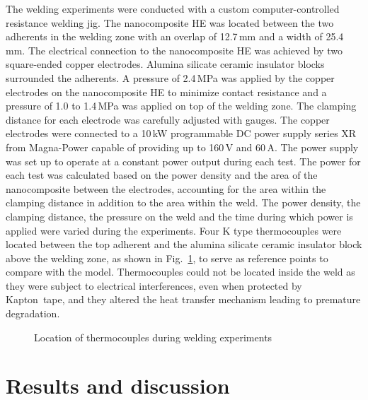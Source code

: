 The welding experiments were conducted with a custom computer-controlled resistance welding jig. 
The nanocomposite HE was located between the two adherents in the welding zone with an overlap of \mbox{12.7\,mm} and a width of \mbox{25.4\,mm}. 
The electrical connection to the nanocomposite HE was achieved by two square-ended copper electrodes. 
Alumina silicate ceramic insulator blocks surrounded the adherents. 
A pressure of \mbox{2.4\,MPa} was applied by the copper electrodes on the nanocomposite HE to minimize contact resistance and a pressure of 1.0 to \mbox{1.4\,MPa} was applied on top of the welding zone. 
The clamping distance for each electrode was carefully adjusted with gauges. 
The copper electrodes were connected to a \mbox{10\,kW} programmable DC power supply series XR from Magna-Power capable of providing up to \mbox{160\,V} and \mbox{60\,A}. 
The power supply was set up to operate at a constant power output during each test. 
The power for each test was calculated based on the power density and the area of the nanocomposite between the electrodes, accounting for the area within the clamping distance in addition to the area within the weld. 
The power density, the clamping distance, the pressure on the weld and the time during which power is applied were varied during the experiments. 
Four K type thermocouples were located between the top adherent and the alumina silicate ceramic insulator block above the welding zone, as shown in \mbox{Fig. \ref{fig:2_Fig3}}, to serve as reference points to compare with the model. 
Thermocouples could not be located inside the weld as they were subject to electrical interferences, even when protected by Kapton\textregistered \ tape, and they altered the heat transfer mechanism leading to premature degradation.  

\begin{figure}[ht]
	\center
	\resizebox{0.75\textwidth}{!}{
	}
	\caption{Location of thermocouples during welding experiments}
	\label{fig:2_Fig3}
\end{figure} 

\FloatBarrier
\section{Results and discussion}

